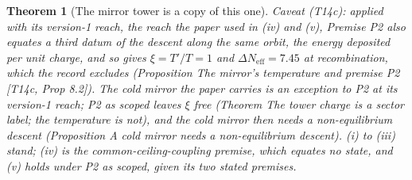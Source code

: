 \documentclass[11pt]{article}
\newtheorem{theorem}{Theorem}[section]
\theoremstyle{definition}
\theoremstyle{plain}
\providecommand{\Neff}{}\renewcommand{\Neff}{N_{\mathrm{eff}}}
\begin{document}
\begin{theorem}[The mirror tower is a copy of this one]
Caveat (T14c): applied with its version-1 reach, the reach the paper used in (iv) and (v), Premise P2 also equates a third datum of the descent along the same orbit, the energy deposited per unit charge, and so gives $\xi = T'/T = 1$ and $\Delta\Neff = 7.45$ at recombination, which the record excludes (Proposition \emph{The mirror's temperature and premise P2} [T14c, Prop 8.2]). The cold mirror the paper carries is an exception to P2 at its version-1 reach; P2 as scoped leaves $\xi$ free (Theorem \emph{The tower charge is a sector label; the temperature is not}), and the cold mirror then needs a non-equilibrium descent (Proposition \emph{A cold mirror needs a non-equilibrium descent}). (i) to (iii) stand; (iv) is the common-ceiling-coupling premise, which equates no state, and (v) holds under P2 as scoped, given its two stated premises.
\end{theorem}
\end{document}
